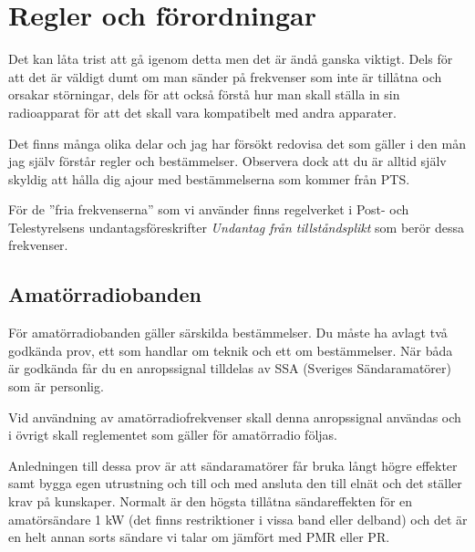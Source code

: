\documentclass[12ypt,swedish,a4paper]{report}
\begin{document}
\tableofcontents

\setlength{\parskip}{1em plus 0.3em minus 0.1em}
\setlength{\parindent}{0pt}

\pagestyle{fancy}

\lhead{\nouppercase{\leftmark}}
\chead{}
\rhead{\nouppercase{\rightmark}}

\cfoot{\thepage}

\renewcommand{\headrulewidth}{0.2pt}
\renewcommand{\footrulewidth}{0.2pt}



\chapter{Regler och förordningar}

Det kan låta trist att gå igenom detta men det är ändå ganska viktigt. Dels för att det är väldigt dumt om man sänder på frekvenser som inte är tillåtna och orsakar störningar, dels för att också förstå hur man skall ställa in sin radioapparat för att det skall vara kompatibelt med andra apparater.

Det finns många olika delar och jag har försökt redovisa det som gäller i den mån jag själv förstår regler och bestämmelser. Observera dock att du är alltid själv skyldig att hålla dig ajour med bestämmelserna som kommer från PTS.

För de ''fria frekvenserna'' som vi använder finns regelverket i Post- och Telestyrelsens undantagsföreskrifter \textit{Undantag från tillståndsplikt} som berör dessa frekvenser.

\section{Amatörradiobanden}

För amatörradiobanden gäller särskilda bestämmelser. Du måste ha avlagt två godkända prov, ett som handlar om teknik och ett om bestämmelser. När båda är godkända får du en anropssignal tilldelas av SSA (Sveriges Sändaramatörer) som är personlig.

Vid användning av amatörradiofrekvenser skall denna anropssignal användas och i övrigt skall reglementet som gäller för amatörradio följas. 

Anledningen till dessa prov är att sändaramatörer får bruka långt högre effekter samt bygga egen utrustning och till och med ansluta den till elnät och det ställer krav på kunskaper. Normalt är den högsta tillåtna sändareffekten för en amatörsändare 1 kW (det finns restriktioner i vissa band eller delband) och det är en helt annan sorts sändare vi talar om jämfört med PMR eller PR.
\end{document}
